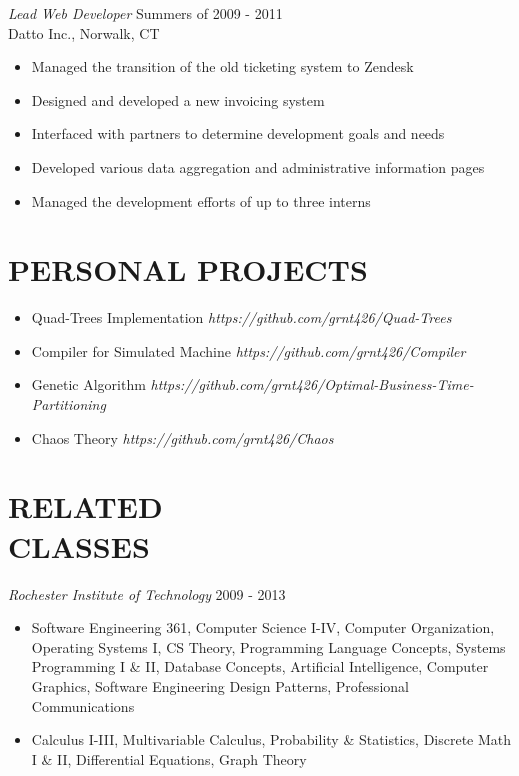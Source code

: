 \documentclass[line,margin]{res}
\begin{document}
\begin{resume}
	{\sl Lead Web Developer} \hfill Summers of 2009 - 2011 \\
                Datto Inc., Norwalk, CT
                 \begin{itemize}  \itemsep -2pt %
	\item Managed the transition of the old ticketing system to Zendesk
	\item Designed and developed a new invoicing system
	\item Interfaced with partners to determine development goals and needs
	\item Developed various data aggregation and administrative information pages
	\item Managed the development efforts of up to three interns
	\end{itemize}
 
 
\section{PERSONAL PROJECTS}  

	 \begin{itemize}  \itemsep -2pt %
		\item Quad-Trees Implementation {\sl https://github.com/grnt426/Quad-Trees}
		\item Compiler for Simulated Machine {\sl https://github.com/grnt426/Compiler}
		\item Genetic Algorithm {\sl https://github.com/grnt426/Optimal-Business-Time-Partitioning}
		\item Chaos Theory {\sl https://github.com/grnt426/Chaos}
	 \end{itemize}

\section{RELATED \\ CLASSES} {\sl Rochester Institute of Technology} \hfill 2009 - 2013
	\begin{itemize}  \itemsep -2pt %
	\item Software Engineering 361, Computer Science I-IV, Computer Organization, Operating Systems I, CS Theory, Programming Language Concepts, Systems Programming I \& II, Database Concepts, Artificial Intelligence, Computer Graphics, Software Engineering Design Patterns, Professional Communications
	\item Calculus I-III, Multivariable Calculus, Probability \& Statistics, Discrete Math I \& II, Differential Equations, Graph Theory
	\end{itemize}


\end{resume}
\end{document}
